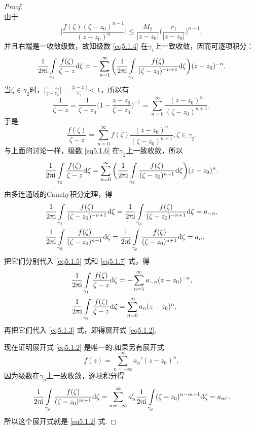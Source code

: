 \begin{proof}
\begin{equation}
\end{equation}
由于
\[\bigg|\frac{f(\zeta)(\zeta-z_0)^{n-1}}{(z-z_0)^n}\bigg|
\le\frac{M_1}{|z-z_0|}\bigg(\frac{r_1}{|z-z_0|}\bigg)^{n-1},\]
并且右端是一收敛级数，故知级数 \eqref{eq5.1.4} 在$\gamma_1$上一致收敛，因而可逐项积分：
\begin{equation}\label{eq5.1.5}
\frac1{2\uppi\mathrm i}\int\limits_{\gamma_1}\frac{f(\zeta)}{\zeta-z}\textrm d\zeta
=-\sum_{n=1}^\infty\bigg(\frac1{2\uppi\mathrm i}\int\limits_{\gamma_1}
\frac{f(\zeta)}{(\zeta-z_0)^{-n+1}}\textrm d\zeta\bigg)(z-z_0)^{-n}.
\end{equation}
当$\zeta\in\gamma_2$时，$\bigg|\frac{z-z_0}{\zeta-z_0}\bigg|=\frac{|z-z_0|}{r_2}<1$，所以有
\[\frac1{\zeta-z}=\frac1{\zeta-z_0}\bigg(1-\frac{z-z_0}{\zeta-z_0}\bigg)^{-1}
=\sum_{n=0}^\infty\frac{(z-z_0)^n}{(\zeta-z_0)^{n+1}},\]
于是
\begin{equation}\label{eq5.1.6}
\frac{f(\zeta)}{\zeta-z}=\sum_{n=0}^\infty f(\zeta)\frac{(z-z_0)^{n}}{(\zeta-z_0)^{n+1}},\zeta\in\gamma_2.
\end{equation}
与上面的讨论一样，级数 \eqref{eq5.1.6} 在$\gamma_2$上一致收敛，所以
\begin{equation}\label{eq5.1.7}
\frac1{2\uppi\mathrm i}\int\limits_{\gamma_2}\frac{f(\zeta)}{\zeta-z}\textrm d\zeta
=\sum_{n=0}^\infty\bigg(\frac1{2\uppi\mathrm i}\int\limits_{\gamma_2}
\frac{f(\zeta)}{(\zeta-z_0)^{n+1}}\textrm d\zeta\bigg)(z-z_0)^{n}.
\end{equation}
由多连通域的Cauchy积分定理，得
\begin{align*}
&\frac1{2\uppi\mathrm i}\int\limits_{\gamma_1}
\frac{f(\zeta)}{(\zeta-z_0)^{-n+1}}\textrm d\zeta
=\frac1{2\uppi\mathrm i}\int\limits_{\gamma_\rho}
\frac{f(\zeta)}{(\zeta-z_0)^{-n+1}}\textrm d\zeta=a_{-n},\\
&\frac1{2\uppi\mathrm i}\int\limits_{\gamma_2}
\frac{f(\zeta)}{(\zeta-z_0)^{n+1}}\textrm d\zeta
=\frac1{2\uppi\mathrm i}\int\limits_{\gamma_\rho}
\frac{f(\zeta)}{(\zeta-z_0)^{n+1}}\textrm d\zeta=a_{n}.
\end{align*}
把它们分别代入 \eqref{eq5.1.5} 式和 \eqref{eq5.1.7} 式，得
\begin{align*}
&\frac1{2\uppi\mathrm i}\int\limits_{\gamma_1}\frac{f(\zeta)}{\zeta-z}\textrm d\zeta
=-\sum_{n=1}^\infty a_{-n}(z-z_0)^{-n},\\
&\frac1{2\uppi\mathrm i}\int\limits_{\gamma_2}\frac{f(\zeta)}{\zeta-z}\textrm d\zeta
=\sum_{n=0}^\infty a_n(z-z_0)^n,
\end{align*}
再把它们代入 \eqref{eq5.1.3} 式，即得展开式 \eqref{eq5.1.2}.

现在证明展开式 \eqref{eq5.1.2} 是唯一的.如果另有展开式
\[f(z)=\sum_{n=-\infty}^{\infty}a_n'(z-z_0)^n,\]
因为级数在$\gamma_\rho$上一致收敛，逐项积分得
\[\frac1{2\uppi\mathrm i}\int\limits_{\gamma_\rho}
\frac{f(\zeta)}{(\zeta-z_0)^{m+1}}\textrm d\zeta
=\sum_{n=-\infty}^\infty a_n'\frac1{2\uppi\mathrm i}
\int\limits_{\gamma_\rho}(\zeta-z_0)^{n-m-1}\textrm d\zeta=a_{m'}.\]
所以这个展开式就是 \eqref{eq5.1.2} 式.
\end{proof}

